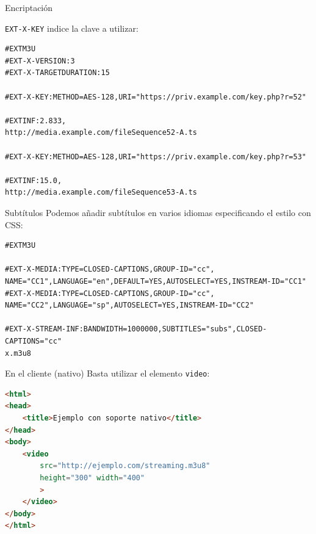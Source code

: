 \documentclass[10pt,compress,usetitleprogressbar,mathserif]{beamer}
\begin{document}
\begin{frame}[fragile]{Encriptación} %

\texttt{EXT-X-KEY} indice la clave a utilizar:

\begin{lstlisting}
#EXTM3U
#EXT-X-VERSION:3
#EXT-X-TARGETDURATION:15

#EXT-X-KEY:METHOD=AES-128,URI="https://priv.example.com/key.php?r=52"

#EXTINF:2.833,
http://media.example.com/fileSequence52-A.ts

#EXT-X-KEY:METHOD=AES-128,URI="https://priv.example.com/key.php?r=53"

#EXTINF:15.0,
http://media.example.com/fileSequence53-A.ts
\end{lstlisting}
\end{frame}

\begin{frame}[fragile]{Subtítulos}
Podemos añadir subtítulos en varios idiomas especificando el estilo con CSS:

\begin{lstlisting}
#EXTM3U

#EXT-X-MEDIA:TYPE=CLOSED-CAPTIONS,GROUP-ID="cc",
NAME="CC1",LANGUAGE="en",DEFAULT=YES,AUTOSELECT=YES,INSTREAM-ID="CC1"
#EXT-X-MEDIA:TYPE=CLOSED-CAPTIONS,GROUP-ID="cc",
NAME="CC2",LANGUAGE="sp",AUTOSELECT=YES,INSTREAM-ID="CC2"

#EXT-X-STREAM-INF:BANDWIDTH=1000000,SUBTITLES="subs",CLOSED-CAPTIONS="cc"
x.m3u8
\end{lstlisting}
\end{frame}

\begin{frame}[fragile]{En el cliente (nativo)}
  Basta utilizar el elemento \texttt{video}:

\begin{lstlisting}[language=HTML]
<html>
<head>
    <title>Ejemplo con soporte nativo</title>
</head>
<body>
    <video
        src="http://ejemplo.com/streaming.m3u8"
        height="300" width="400"
        >
    </video>
</body>
</html>
\end{lstlisting}
\end{frame}
\end{document}
